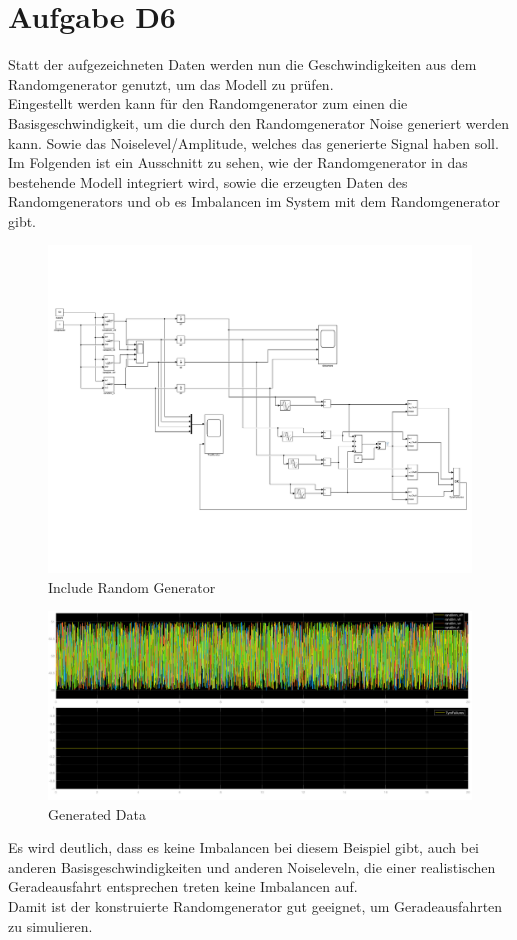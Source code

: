 
\chapter{Aufgabe D6}
Statt der aufgezeichneten Daten werden nun die Geschwindigkeiten aus dem Randomgenerator genutzt, um das Modell zu prüfen. \\
Eingestellt werden kann für den Randomgenerator zum einen die Basisgeschwindigkeit, um die durch den Randomgenerator Noise generiert werden kann. Sowie das Noiselevel/Amplitude, welches das generierte Signal haben soll. Im Folgenden ist ein Ausschnitt zu sehen, wie der Randomgenerator  in das bestehende Modell integriert wird, sowie die erzeugten Daten des Randomgenerators und ob es Imbalancen im System mit dem Randomgenerator gibt.
\begin{figure}[H]
	\centering
	\includegraphics[width=0.95\linewidth]{../Graphiken/TireSimRandom}
	\caption{Include Random Generator}
	\label{fig:randomGeneratorAusschnitt}
\end{figure}
\begin{figure}[H]
	\centering
	\includegraphics[width=0.95\linewidth]{../Graphiken/RandomGeneratorData}
	\caption{Generated Data}
	\label{fig:randomgeneratordata}
\end{figure}
Es wird deutlich, dass es keine Imbalancen bei diesem Beispiel gibt, auch bei anderen Basisgeschwindigkeiten und anderen Noiseleveln, die einer realistischen Geradeausfahrt entsprechen treten keine Imbalancen auf.\\
Damit ist der konstruierte Randomgenerator gut geeignet, um Geradeausfahrten zu simulieren.\\

